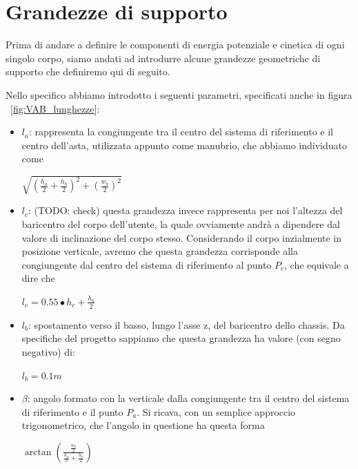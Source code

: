 \section{Grandezze di supporto}
Prima di andare a definire le componenti di energia potenziale e cinetica di ogni singolo corpo, siamo andati ad introdurre alcune grandezze geometriche di supporto che definiremo qui di seguito.

Nello specifico abbiamo introdotto i seguenti parametri, specificati anche in figura ~\ref{fig:VAB_lunghezze}:
\begin{itemize}
	\item \textbf{$l_a$}: rappresenta la congiungente tra il centro del sistema di riferimento e il centro dell'asta, utilizzata appunto come manubrio, che abbiamo individuato come
	\begin{center}
		{\Large $\sqrt{(\frac{h_a}{2} + \frac{h_b}{2})^2 + (\frac{w_b}{2})^2}$}
	\end{center}
	\item \textbf{$l_c$}: (TODO: check) questa grandezza invece rappresenta per noi l'altezza del baricentro del corpo dell'utente, la quale ovviamente andrà a dipendere dal valore di inclinazione del corpo stesso.
	Considerando il corpo inzialmente in posizione verticale, avremo che questa grandezza corrisponde alla congiungente dal centro del sistema di riferimento al punto $P_c$, che equivale a dire che
	\begin{center}
		$l_c = 0.55\bullet h_c + \frac{h_b}{2}$
	\end{center}
	\item \textbf{$l_b$}: spostamento verso il basso, lungo l'asse z, del baricentro dello chassis. Da specifiche del progetto sappiamo che questa grandezza ha valore (con segno negativo) di:
	\begin{center}
		$l_b = 0.1 m$
	\end{center}
	\item \textbf{$\beta$}: angolo formato con la verticale dalla congiungente tra il centro del sistema di riferimento e il punto $P_a$. Si ricava, con un semplice approccio trigonometrico, che l'angolo in questione ha questa forma
	\begin{center}
		$\arctan{(\frac{\frac{w_b}{2}}{\frac{h_a}{2} + \frac{h_b}{2}})}$
	\end{center}
\end{itemize}

